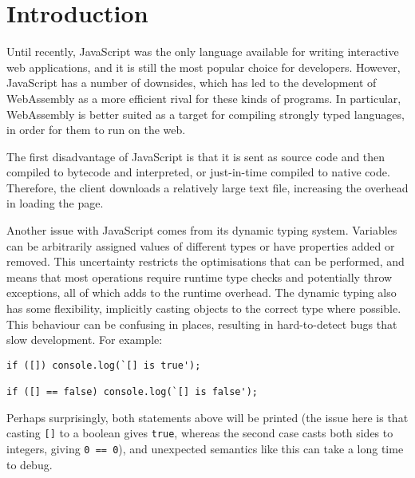\chapter{Introduction}

Until recently, JavaScript was the only language available for writing interactive web applications, and it is still the most popular choice for developers. 
%
However, JavaScript has a number of downsides, which has led to the development of WebAssembly as a more efficient rival for these kinds of programs. In particular, WebAssembly is better suited as a target for compiling strongly typed languages, in order for them to run on the web. %
%

The first disadvantage of JavaScript is that it is sent as source code and then compiled to bytecode  and interpreted, or just-in-time compiled to native code. Therefore, the client downloads a relatively large text file, increasing the overhead in  loading the page. 

Another issue with JavaScript comes from its dynamic typing system. Variables can be arbitrarily assigned values of different types or have properties added or removed. This uncertainty restricts the optimisations that can be performed, and means that most operations require runtime type checks and potentially throw exceptions, all of which adds to the runtime overhead.
%
The dynamic typing also has some flexibility, implicitly casting objects to the correct type where possible. This behaviour can be confusing in places, resulting in hard-to-detect bugs that slow development. For example:

\begin{verbatim}
if ([]) console.log(`[] is true');

if ([] == false) console.log(`[] is false');
\end{verbatim}

Perhaps surprisingly, both statements above will be printed (the issue here is that casting \verb|[]| to a boolean gives \verb|true|, whereas the second case casts both sides to integers, giving \verb|0 == 0|), and unexpected semantics like this can take a long time to debug.

